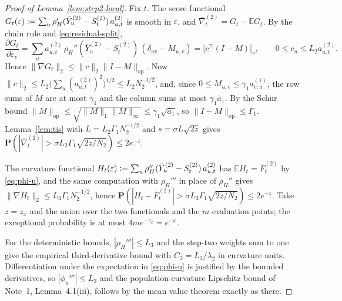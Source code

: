 \documentclass[11pt]{article}
\newcommand{\E}{\mathbb{E}}
\newcommand{\Pp}{\mathbf{P}}
\newcommand{\eqdef}{\mathrel{\vcentcolon=}}
\newcommand{\norm}[1]{\lVert#1\rVert}
\newcommand{\Data}{Y}
\newcommand{\IMFs}{S}
\newcommand{\IF}{F}
\newcommand{\Mop}{M}
\theoremstyle{definition}
\begin{document}
\begin{proof}[Proof of Lemma~\ref{lem:step2-local}]
Fix \(t\).  The score functional
\(G_t(\varepsilon)\eqdef\sum_u\rho_H'(\bar\Data^{(2)}_u-\IMFs^{(2)}_t)\,a^{(2)}_{u,t}\)
is smooth in \(\varepsilon\), and \(\bar\nabla^{(2)}_t=G_t-\E G_t\).  By
the chain rule and \eqref{eq:residual-split},
\[
  \frac{\partial G_t}{\partial\varepsilon_v}
  =\sum_u a^{(2)}_{u,t}\,\rho_H''(\bar\Data^{(2)}_u-\IMFs^{(2)}_t)
    \,(\delta_{uv}-\Mop_{u,v})
  =\bigl[c^{\top}(I-\Mop)\bigr]_v,
  \qquad
  0\leq c_u\leq L_2a^{(2)}_{u,t}.
\]
Hence \(\norm{\nabla G_t}_2\leq\norm c_2\norm{I-\Mop}_{\mathrm{op}}\).
Now \(\norm c_2\leq L_2\bigl(\sum_u(a^{(2)}_{u,t})^2\bigr)^{1/2}\leq L_2N_2^{-1/2}\),
and, since \(0\leq\Mop_{u,v}\leq\gamma_1a^{(1)}_{v,u}\), the row sums of
\(\Mop\) are at most \(\gamma_1\) and the column sums at most
\(\gamma_1\bar a_1\).  By the Schur bound
\(\norm{\Mop}_{\mathrm{op}}\leq\sqrt{\norm{\Mop}_1\norm{\Mop}_\infty}\leq\gamma_1\sqrt{\bar a_1}\),
so \(\norm{I-\Mop}_{\mathrm{op}}\leq\Gamma_1\).  Lemma~\ref{lem:tis} with
\(L=L_2\Gamma_1N_2^{-1/2}\) and \(s=\sigma L\sqrt{2z}\) gives
\(\Pp(|\bar\nabla^{(2)}_t|>\sigma L_2\Gamma_1\sqrt{2z/N_2})\leq2e^{-z}\).

The curvature functional
\(H_t(\varepsilon)\eqdef\sum_u\rho_H''(\bar\Data^{(2)}_u-\IMFs^{(2)}_t)\,a^{(2)}_{u,t}\)
has \(\E H_t=\bar\IF^{(2)}_t\) by \eqref{eq:phi-u}, and the same
computation with \(\rho_H'''\) in place of \(\rho_H''\) gives
\(\norm{\nabla H_t}_2\leq L_3\Gamma_1N_2^{-1/2}\), hence
\(\Pp(|H_t-\bar\IF^{(2)}_t|>\sigma L_3\Gamma_1\sqrt{2z/N_2})\leq2e^{-z}\).
Take \(z=z_x\) and the union over the two functionals and the \(m\)
evaluation points; the exceptional probability is at most
\(4me^{-z_x}=e^{-x}\).

For the deterministic bounds, \(|\rho_H'''|\leq L_3\) and the step-two
weights sum to one give the empirical third-derivative bound with
\(C_3=L_3/\lambda_2\) in curvature units.  Differentiation under the
expectation in \eqref{eq:phi-u} is justified by the bounded derivatives, so
\(|\phi_u'''|\leq L_3\) and the population-curvature Lipschitz bound of
Note~1, Lemma~4.1(iii), follows by the mean value theorem exactly as there.
\end{proof}
\end{document}
